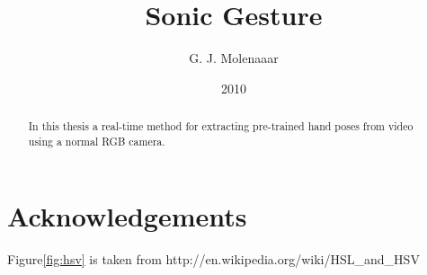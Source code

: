 \documentclass[a4paper]{report}
\begin{document}
\title{Sonic Gesture}
\author{G. J. Molenaaar}
\date{2010}

\maketitle

\newpage
\newpage

\tableofcontents
\listoffigures
\listoftables

\chapter*{Acknowledgements}
Figure\ref{fig:hsv} is taken from http://en.wikipedia.org/wiki/HSL\_and\_HSV

\begin{abstract}
In this thesis a real-time method for extracting pre-trained hand poses from
video using a normal RGB camera.
\end{abstract}










%
%
%





\end{document}
